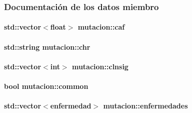 \subsubsection{Documentación de los datos miembro}
\paragraph[{\texorpdfstring{caf}{caf}}]{\setlength{\rightskip}{0pt plus 5cm}std\+::vector$<$float$>$ mutacion\+::caf\hspace{0.3cm}{\ttfamily [private]}}\hypertarget{classmutacion_aef3fe46b6a2d10e3993703ebd5d5be5f}{}\label{classmutacion_aef3fe46b6a2d10e3993703ebd5d5be5f}
\paragraph[{\texorpdfstring{chr}{chr}}]{\setlength{\rightskip}{0pt plus 5cm}std\+::string mutacion\+::chr\hspace{0.3cm}{\ttfamily [private]}}\hypertarget{classmutacion_ab69021961d68dd5232b4bc3f849ddf13}{}\label{classmutacion_ab69021961d68dd5232b4bc3f849ddf13}
\paragraph[{\texorpdfstring{clnsig}{clnsig}}]{\setlength{\rightskip}{0pt plus 5cm}std\+::vector$<$int$>$ mutacion\+::clnsig\hspace{0.3cm}{\ttfamily [private]}}\hypertarget{classmutacion_a0d029eee6925649df15081b780c12e37}{}\label{classmutacion_a0d029eee6925649df15081b780c12e37}
\paragraph[{\texorpdfstring{common}{common}}]{\setlength{\rightskip}{0pt plus 5cm}bool mutacion\+::common\hspace{0.3cm}{\ttfamily [private]}}\hypertarget{classmutacion_a6dabfef6167d64030f095887b15f65dd}{}\label{classmutacion_a6dabfef6167d64030f095887b15f65dd}
\paragraph[{\texorpdfstring{enfermedades}{enfermedades}}]{\setlength{\rightskip}{0pt plus 5cm}std\+::vector$<${\bf enfermedad}$>$ mutacion\+::enfermedades\hspace{0.3cm}{\ttfamily [private]}}\hypertarget{classmutacion_ac8cca92dea1ab6fb9c193eed55a5ad28}{}\label{classmutacion_ac8cca92dea1ab6fb9c193eed55a5ad28}
